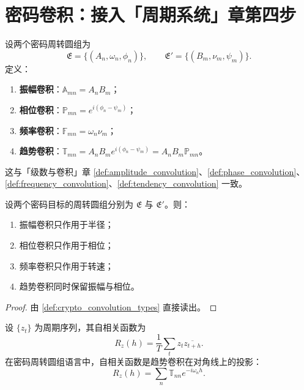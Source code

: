 \section{密码卷积：接入「周期系统」章第四步}
\label{sec:crypto_convolution}

\begin{definition}\label{def:crypto_convolution_types}
设两个密码周转圆组为
\[
\mathfrak E=\{(A_n,\omega_n,\phi_n)\},\qquad
\mathfrak E'=\{(B_m,\nu_m,\psi_m)\}.
\]
定义：
\begin{enumerate}[label=(\roman*)]
    \item \textbf{振幅卷积}：\(\mathbb A_{mn}=A_nB_m\)；
    \item \textbf{相位卷积}：\(\mathbb P_{mn}=e^{i(\phi_n-\psi_m)}\)；
    \item \textbf{频率卷积}：\(\mathbb F_{mn}=\omega_n\nu_m\)；
    \item \textbf{趋势卷积}：\(\mathbb T_{mn}=A_nB_m e^{i(\phi_n-\psi_m)}=A_nB_m\mathbb P_{mn}\)。
\end{enumerate}
这与「级数与卷积」章 \cref{def:amplitude_convolution}、\cref{def:phase_convolution}、\cref{def:frequency_convolution}、\cref{def:tendency_convolution} 一致。
\end{definition}

\begin{theorem}[三类卷积在密码周转圆组上的作用]\label{thm:crypto_convolution_action}
设两个密码目标的周转圆组分别为 \(\mathfrak E\) 与 \(\mathfrak E'\)。则：
\begin{enumerate}[label=(\roman*)]
    \item 振幅卷积只作用于半径；
    \item 相位卷积只作用于相位；
    \item 频率卷积只作用于转速；
    \item 趋势卷积同时保留振幅与相位。
\end{enumerate}
\end{theorem}

\begin{proof}
由 \cref{def:crypto_convolution_types} 直接读出。
\end{proof}

\begin{proposition}[自相关与趋势卷积]\label{prop:crypto_autocorr_phase_convolution}
设 \(\{z_t\}\) 为周期序列，其自相关函数为
\[
R_z(h)=\frac1T\sum_t z_t\overline{z_{t+h}}.
\]
在密码周转圆组语言中，自相关函数是趋势卷积在对角线上的投影：
\[
R_z(h)=\sum_n\mathbb T_{nn}e^{-i\omega_n h}.
\]
\end{proposition}

